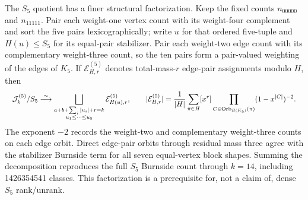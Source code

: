 \documentclass{article}
\newcommand{\fitmath}[1]{\resizebox{0.99\linewidth}{!}{$\displaystyle #1$}}
\begin{document}
The $S_5$ quotient has a finer structural factorization. Keep the fixed counts
$n_{00000}$ and $n_{11111}$. Pair each weight-one vertex count with its
weight-four complement and sort the five pairs lexicographically; write $u$ for
that ordered five-tuple and $H(u)\leq S_5$ for its equal-pair stabilizer. Pair
each weight-two edge count with its complementary weight-three count, so the
ten pairs form a pair-valued weighting of the edges of $K_5$. If
$\mathcal E^{(5)}_{H,r}$ denotes total-mass-$r$ edge-pair assignments modulo
$H$, then
\begin{equation}
  \fitmath{%
    \mathcal J^{(5)}_k/S_5
      \overset{\sim}{\longrightarrow}
      \bigsqcup_{\substack{a+b+\sum_i |u_i|+r=k\\u_1\leq\cdots\leq u_5}}
        \mathcal E^{(5)}_{H(u),r},
    \qquad
    |\mathcal E^{(5)}_{H,r}|=
      \frac{1}{|H|}\sum_{\pi\in H}[x^r]
      \prod_{C\in\operatorname{Orb}_{E(K_5)}(\pi)}
        (1-x^{|C|})^{-2}.
  }
  \label{eq:optimization-crazy-preimage-cube-unordered-quintuple-decomposition}
\end{equation}
The exponent $-2$ records the weight-two and complementary weight-three counts
on each edge orbit. Direct edge-pair orbits through residual mass three agree
with the stabilizer Burnside term for all seven equal-vertex block shapes.
Summing the decomposition reproduces the full $S_5$ Burnside count through
$k=14$, including 1426354541 classes. This factorization is a prerequisite for,
not a claim of, dense $S_5$ rank/unrank.
\end{document}
